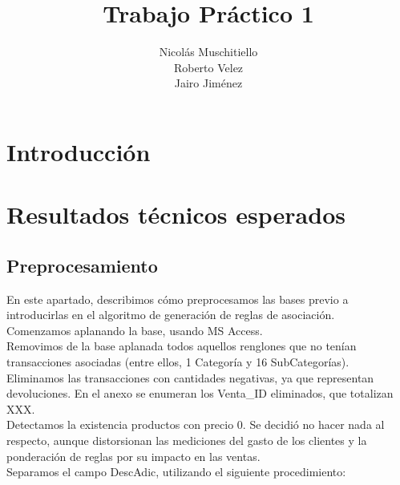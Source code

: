 \documentclass[]{article}
\title{Trabajo Práctico 1}
\author{Nicolás Muschitiello \\
	Roberto Velez\\
	Jairo Jiménez
	}
\begin{document}
\maketitle

\section{Introducción}




\section{Resultados técnicos esperados}
\subsection{Preprocesamiento}
En este apartado, describimos cómo preprocesamos las bases previo a introducirlas en el algoritmo de generación de reglas de asociación.\\

Comenzamos aplanando la base, usando MS Access.\\

Removimos de la base aplanada todos aquellos renglones que no tenían transacciones asociadas (entre ellos, 1 Categoría y 16 SubCategorías).\\

Eliminamos las transacciones con cantidades negativas, ya que representan devoluciones. En el anexo se enumeran los Venta\_ID eliminados, que totalizan XXX.\\

Detectamos la existencia productos con precio 0. Se decidió no hacer nada al respecto, aunque distorsionan las mediciones del gasto de los clientes y la ponderación de reglas por su impacto en las ventas.\\

Separamos el campo DescAdic, utilizando el siguiente procedimiento:\\
\end{document}
